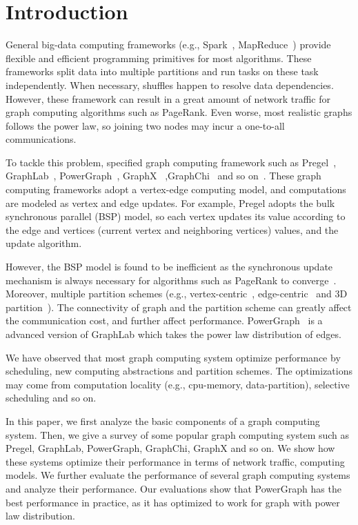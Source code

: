 \documentclass{acm_proc_article}
\newcommand{\eg}[0]{e.g.,}
\begin{document}
\section{Introduction}
General big-data computing frameworks (\eg{} Spark~\cite{spark}, MapReduce~\cite{mapreduce}) provide
flexible and efficient programming primitives for most algorithms.
These frameworks split data into multiple partitions and run tasks on
these task independently. When necessary, shuffles happen to resolve data
dependencies.
However, these framework can result in a great amount of network traffic
for graph computing algorithms such as PageRank. Even worse, most realistic graphs
follows the power law, so joining two nodes may incur a one-to-all communications.

To tackle this problem, specified graph computing framework such as
Pregel~\cite{pregel},
GraphLab~\cite{graphlab}, PowerGraph~\cite{powergraph}, GraphX~\cite{graphx}
,GraphChi~\cite{graphchi} and so on~\cite{distributed:graphlab,kineograph}. These graph computing frameworks
adopt a vertex-edge computing model, and computations are modeled
as vertex and edge updates. For example, Pregel adopts the bulk
synchronous parallel (BSP) model, so each vertex updates its value according
to the edge and vertices (current vertex and neighboring vertices) values, and
the update algorithm.

However, the BSP model is found to be inefficient as the synchronous update
mechanism is always necessary for algorithms such as PageRank to
converge~\cite{graphlab,powergraph}. Moreover, multiple partition schemes (\eg{} vertex-centric~\cite{pregel},
edge-centric~\cite{xstream} and 3D partition~\cite{cube:osdi16}). The connectivity
of graph and the partition scheme can greatly affect the communication cost, and
further affect performance. PowerGraph~\cite{powergraph} is a advanced version of
GraphLab which takes the power law distribution of edges.

We have observed that most graph computing system optimize performance by
scheduling, new computing abstractions and partition schemes. The optimizations
may come from computation locality (\eg{} cpu-memory, data-partition),
selective scheduling and so on. 

In this paper, we first analyze the basic components of a graph computing
system. Then, we give a survey of some popular graph computing system
such as Pregel, GraphLab, PowerGraph, GraphChi, GraphX and so on. We show
how these systems optimize their performance in terms of network traffic,
computing models.
We further evaluate the performance of several graph computing systems
and analyze their performance.
Our evaluations show that PowerGraph has the best performance in practice,
as it has optimized to work for graph with power law distribution.
\end{document}
